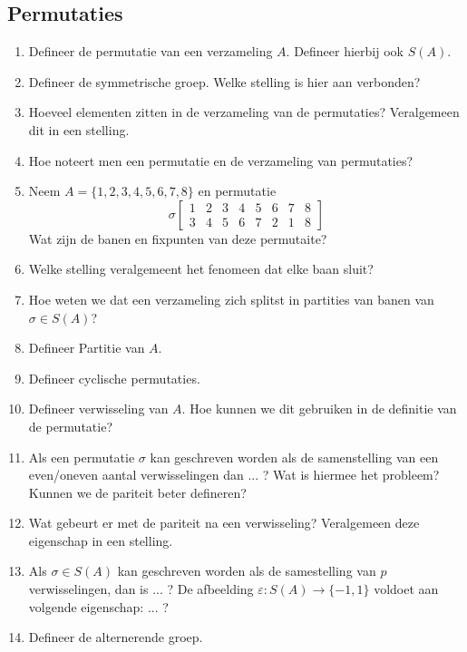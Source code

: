 \documentclass[12pt]{article}
\begin{document}
    \subsection{Permutaties}
    \begin{enumerate}
        \item Defineer de permutatie van een verzameling $A$. Defineer hierbij ook $S(A)$.
        \item Defineer de symmetrische groep. Welke stelling is hier aan verbonden?
        \item Hoeveel elementen zitten in de verzameling van de permutaties? Veralgemeen dit in een stelling.
        \item Hoe noteert men een permutatie en de verzameling van permutaties?
        \item Neem $A=\{1,2,3,4,5,6,7,8\}$ en permutatie $$\sigma \begin{bmatrix}
            1 & 2 & 3 & 4 & 5 & 6 & 7 & 8 \\
            3 & 4 & 5 & 6 & 7 & 2 & 1 & 8 
        \end{bmatrix}$$ Wat zijn de banen en fixpunten van deze permutaite?
        \item Welke stelling veralgemeent het fenomeen dat elke baan sluit?
        \item Hoe weten we dat een verzameling zich splitst in partities van banen van $\sigma \in S(A)$?
        \item Defineer Partitie van $A$.
        \item Defineer cyclische permutaties.
        \item Defineer verwisseling van $A$. Hoe kunnen we dit gebruiken in de definitie van de permutatie?
        \item Als een permutatie $\sigma$ kan geschreven worden als de samenstelling van een even/oneven aantal verwisselingen dan ... ? Wat is hiermee het probleem? Kunnen we de pariteit beter defineren?
        \item Wat gebeurt er met de pariteit na een verwisseling? Veralgemeen deze eigenschap in een stelling.
        \item Als $\sigma \in S(A)$ kan geschreven worden als de samestelling van $p$ verwisselingen, dan is ... ? De afbeelding $\varepsilon:S(A) \rightarrow \{-1,1\}$ voldoet aan volgende eigenschap: ... ?
        \item Defineer de alternerende groep.
    \end{enumerate}
\end{document}
